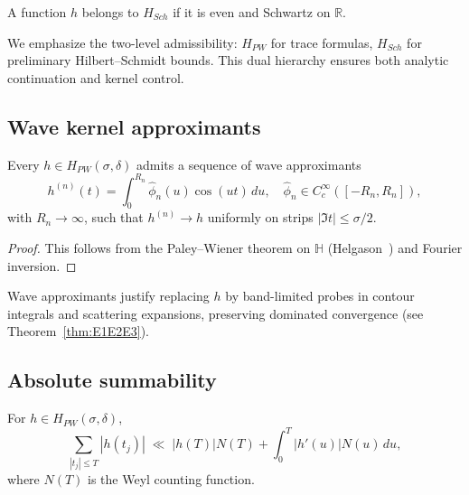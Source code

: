 \begin{definition}
\label{def:Sch}
A function $h$ belongs to $H_{Sch}$ if it is even and Schwartz on $\mathbb{R}$.
\end{definition}

\begin{remark}
We emphasize the two-level admissibility: 
$H_{PW}$ for trace formulas, $H_{Sch}$ for preliminary Hilbert–Schmidt bounds.
This dual hierarchy ensures both analytic continuation and kernel control.
\end{remark}

\subsection{Wave kernel approximants}

\begin{proposition}
\label{prop:wave-approx}
Every $h\in H_{PW}(\sigma,\delta)$ admits a sequence of wave approximants
\[
h^{(n)}(t) = \int_0^{R_n} \widehat{\phi}_n(u)\cos(ut)\,du,
\quad \widehat{\phi}_n\in C_c^\infty([-R_n,R_n]),
\]
with $R_n\to\infty$, such that $h^{(n)}\to h$ uniformly on strips $|\Im t|\leq \sigma/2$.
\end{proposition}

\begin{proof}
This follows from the Paley–Wiener theorem on $\mathbb{H}$ 
(Helgason~\cite{Helgason1970}) and Fourier inversion.
\end{proof}

\begin{remark}
Wave approximants justify replacing $h$ by band-limited probes 
in contour integrals and scattering expansions, 
preserving dominated convergence (see Theorem~\ref{thm:E1E2E3}).
\end{remark}

\subsection{Absolute summability}

\begin{lemma}
\label{lem:summability}
For $h\in H_{PW}(\sigma,\delta)$,
\[
\sum_{|t_j|\leq T} |h(t_j)| \;\ll\; |h(T)|N(T) + \int_0^T |h'(u)|N(u)\,du,
\]
where $N(T)$ is the Weyl counting function.
\end{lemma}

